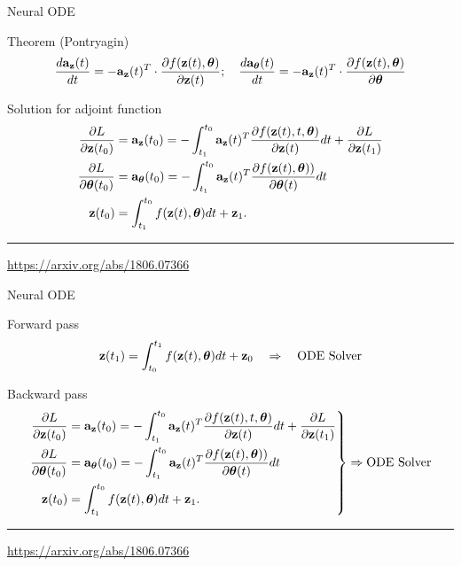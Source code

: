 \begin{frame}{Neural ODE}
	\begin{block}{Theorem (Pontryagin)}
		\vspace{-0.3cm}
		\[
		\frac{d \mathbf{a}_{\mathbf{z}}(t)}{dt} = - \mathbf{a}_{\mathbf{z}}(t)^T \cdot \frac{\partial f(\mathbf{z}(t), \boldsymbol{\theta})}{\partial \mathbf{z}(t)}; \quad  \frac{d \mathbf{a}_{\boldsymbol{\theta}}(t)}{dt} = - \mathbf{a}_{\mathbf{z}}(t)^T \cdot \frac{\partial f(\mathbf{z}(t), \boldsymbol{\theta})}{\partial \boldsymbol{\theta}}
		\]
	\end{block}
	\begin{block}{Solution for adjoint function}
		\begin{align*}
		 \frac{\partial L}{\partial \mathbf{z}(t_0)} &= \mathbf{a}_{\mathbf{z}}(t_0) =  - \int_{t_1}^{t_0} \mathbf{a}_{\mathbf{z}}(t)^T \frac{\partial f(\mathbf{z}(t), t, \boldsymbol{\theta})}{\partial \mathbf{z}(t)} dt + \frac{\partial L}{\partial \mathbf{z}(t_1)} \\
		 \frac{\partial L}{\partial \boldsymbol{\theta}(t_0)} &= \mathbf{a}_{\boldsymbol{\theta}}(t_0) =  - \int_{t_1}^{t_0} \mathbf{a}_{\mathbf{z}}(t)^T \frac{\partial f(\mathbf{z}(t), \boldsymbol{\theta}))}{\partial \boldsymbol{\theta}(t)} dt \\
		 \mathbf{z}(t_0) &= \int^{t_0}_{t_1} f(\mathbf{z}(t), \boldsymbol{\theta}) d t  + \mathbf{z}_1.
		\end{align*}
	\end{block}
	\vfill
	\hrule\medskip
	{\scriptsize \href{https://arxiv.org/abs/1806.07366}{https://arxiv.org/abs/1806.07366}} 
\end{frame}
\begin{frame}{Neural ODE}
	\begin{block}{Forward pass}
		\[
		\mathbf{z}(t_1) = \int^{t_1}_{t_0} f(\mathbf{z}(t), \boldsymbol{\theta}) d t  + \mathbf{z}_0 \quad \Rightarrow \quad \text{ODE Solver}
		\]
	\end{block}
	\begin{block}{Backward pass}
		\small
		\vspace{-0.3cm}
		\begin{equation*}
			{\left.\begin{aligned}
				\frac{\partial L}{\partial \mathbf{z}(t_0)} &= \mathbf{a}_{\mathbf{z}}(t_0) =  - \int_{t_1}^{t_0} \mathbf{a}_{\mathbf{z}}(t)^T \frac{\partial f(\mathbf{z}(t), t, \boldsymbol{\theta})}{\partial \mathbf{z}(t)} dt + \frac{\partial L}{\partial \mathbf{z}(t_1)} \\
				\frac{\partial L}{\partial \boldsymbol{\theta}(t_0)} &= \mathbf{a}_{\boldsymbol{\theta}}(t_0) =  - \int_{t_1}^{t_0} \mathbf{a}_{\mathbf{z}}(t)^T \frac{\partial f(\mathbf{z}(t), \boldsymbol{\theta}))}{\partial \boldsymbol{\theta}(t)} dt \\
				\mathbf{z}(t_0) &= \int^{t_0}_{t_1} f(\mathbf{z}(t), \boldsymbol{\theta}) d t  + \mathbf{z}_1.
			\end{aligned}\right\rbrace} \Rightarrow
			\text{ODE Solver}
		\end{equation*}
	\end{block}
	\vfill
	\hrule\medskip
	{\scriptsize \href{https://arxiv.org/abs/1806.07366}{https://arxiv.org/abs/1806.07366}} 
\end{frame}
